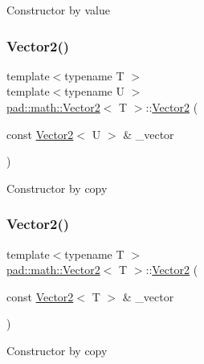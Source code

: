 Constructor by value \mbox{\label{structpad_1_1math_1_1_vector2_aec2b96f829aab2b0676be107f35ba20d}} 
\subsubsection{\texorpdfstring{Vector2()}{Vector2()}\hspace{0.1cm}{\footnotesize\ttfamily [3/5]}}
{\footnotesize\ttfamily template$<$typename T $>$ \\
template$<$typename U $>$ \\
\mbox{\hyperlink{structpad_1_1math_1_1_vector2}{pad\+::math\+::\+Vector2}}$<$ T $>$\+::\mbox{\hyperlink{structpad_1_1math_1_1_vector2}{Vector2}} (\begin{DoxyParamCaption}\item[{const \mbox{\hyperlink{structpad_1_1math_1_1_vector2}{Vector2}}$<$ U $>$ \&}]{\+\_\+vector }\end{DoxyParamCaption})}

Constructor by copy \mbox{\label{structpad_1_1math_1_1_vector2_a4bc5bd2f108554c6d04972a251823cc0}} 
\subsubsection{\texorpdfstring{Vector2()}{Vector2()}\hspace{0.1cm}{\footnotesize\ttfamily [4/5]}}
{\footnotesize\ttfamily template$<$typename T $>$ \\
\mbox{\hyperlink{structpad_1_1math_1_1_vector2}{pad\+::math\+::\+Vector2}}$<$ T $>$\+::\mbox{\hyperlink{structpad_1_1math_1_1_vector2}{Vector2}} (\begin{DoxyParamCaption}\item[{const \mbox{\hyperlink{structpad_1_1math_1_1_vector2}{Vector2}}$<$ T $>$ \&}]{\+\_\+vector }\end{DoxyParamCaption})}

Constructor by copy \mbox{\label{structpad_1_1math_1_1_vector2_aa13fef545bfcfad2d085505821d9af37}} 
